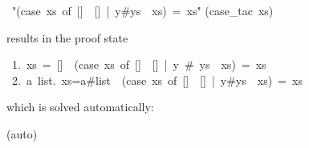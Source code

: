 \begin{isabelle}%
\isanewline
{}~{"}(case~xs~of~[]~{\isasymRightarrow}~[]~|~y\#ys~{\isasymRightarrow}~xs)~=~xs{"}\isanewline
{}(case\_tac~xs)%
\begin{isamarkuptxt}%
\noindent
results in the proof state
\begin{isabellepar}%
~1.~xs~=~[]~{\isasymLongrightarrow}~(case~xs~of~[]~{\isasymRightarrow}~[]~|~y~\#~ys~{\isasymRightarrow}~xs)~=~xs\isanewline
~2.~{\isasymAnd}a~list.~xs=a\#list~{\isasymLongrightarrow}~(case~xs~of~[]~{\isasymRightarrow}~[]~|~y\#ys~{\isasymRightarrow}~xs)~=~xs%
\end{isabellepar}%
which is solved automatically:%
\end{isamarkuptxt}%
(auto)\isanewline
\end{isabelle}%
